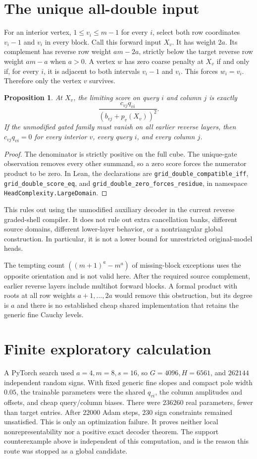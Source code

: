 \documentclass[11pt]{article}
\newtheorem{proposition}{Proposition}
\begin{document}
\section{The unique all-double input}
For an interior vertex, $1\leq v_i\leq m-1$ for every $i$, select both
row coordinates $v_i-1$ and $v_i$ in every block. Call this forward input
$X_v$. It has weight $2a$. Its complement has reverse row weight
$am-2a$, strictly below the target reverse row weight $am-a$ when $a>0$.
A vertex $w$ has zero coarse penalty at $X_v$ if and only if, for every
$i$, it is adjacent to both intervals $v_i-1$ and $v_i$. This forces
$w_i=v_i$. Therefore only the vertex $v$ survives.

\begin{proposition}
At $X_v$, the limiting score on query $i$ and column $j$ is exactly
\[
 \frac{c_{vj}q_{vi}}{(b_{vj}+p_v(X_v))^2}.
\]
If the unmodified gated family must vanish on all earlier reverse layers,
then $c_{vj}q_{vi}=0$ for every interior $v$, every query $i$, and every
column $j$.
\end{proposition}
\begin{proof}
The denominator is strictly positive on the full cube. The unique-gate
observation removes every other summand, so a zero score forces the
numerator product to be zero. In Lean, the declarations are
\texttt{grid\_double\_compatible\_iff},
\texttt{grid\_double\_score\_eq}, and
\texttt{grid\_double\_zero\_forces\_residue}, in namespace
\texttt{HeadComplexity.LargeDomain}.
\end{proof}

This rules out using the unmodified auxiliary decoder in the current
reverse graded-shell compiler. It does not rule out extra cancellation
banks, different source domains, different lower-layer behavior, or a
nontriangular global construction. In particular, it is not a lower
bound for unrestricted original-model heads.

The tempting count $((m+1)^a-m^a)$ of missing-block exceptions uses the
opposite orientation and is not valid here. After the required source
complement, earlier reverse layers include multihot forward blocks.
A formal product with roots at all row weights $a+1,\ldots,2a$ would
remove this obstruction, but its degree is $a$ and there is no established
cheap shared implementation that retains the generic fine Cauchy levels.

\section{Finite exploratory calculation}
A PyTorch search used $a=4,m=8,s=16$, so $G=4096,H=6561$, and
$262144$ independent random signs. With fixed generic fine slopes and
compact pole width $0.05$, the trainable parameters were the shared
$q_{vi}$, the column amplitudes and offsets, and cheap query/column
biases. There were $236260$ real parameters, fewer than target entries.
After $22000$ Adam steps, $230$ sign constraints remained unsatisfied.
This is only an optimization failure. It proves neither local
nonrepresentability nor a positive exact decoder theorem. The support
counterexample above is independent of this computation, and is the
reason this route was stopped as a global candidate.
\end{document}
